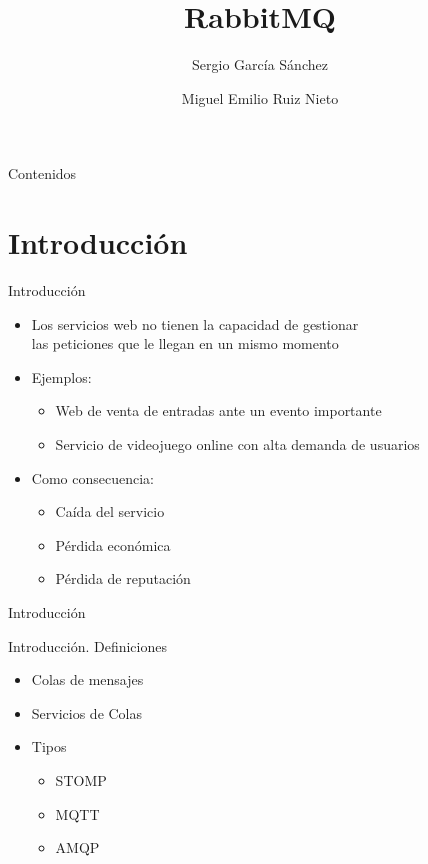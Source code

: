 \documentclass{beamer}
\title[SGDI]{RabbitMQ}
\author[S. García \and M. Ruiz]{Sergio García Sánchez \and Miguel Emilio Ruiz Nieto}
\begin{document}
  \begin{frame}
    \titlepage
  \end{frame}

  \begin{frame}{Contenidos}
    \tableofcontents[hideallsubsections]
  \end{frame}

  \section{Introducción}
  \begin{frame}{Introducción}
    \begin{itemize}
      \item Los servicios web no tienen la capacidad de gestionar\\
      las peticiones que le llegan en un mismo momento
      \item<2-> Ejemplos:
      \begin{itemize}
        \item Web de venta de entradas ante un evento importante
        \item Servicio de videojuego online con alta demanda de
        usuarios
      \end{itemize}
      \item<3-> Como consecuencia:
      \begin{itemize}
        \item Caída del servicio
        \item Pérdida económica
        \item Pérdida de reputación
      \end{itemize}
    \end{itemize}
  \end{frame}

  \begin{frame}{Introducción}
  \end{frame}

  \begin{frame}{Introducción. Definiciones}
    \begin{itemize}
      \item Colas de mensajes
      \item Servicios de Colas
      \item Tipos
      \begin{itemize}
        \item STOMP
        \item MQTT
        \item AMQP
      \end{itemize}
    \end{itemize}

  \end{frame}
\end{document}
